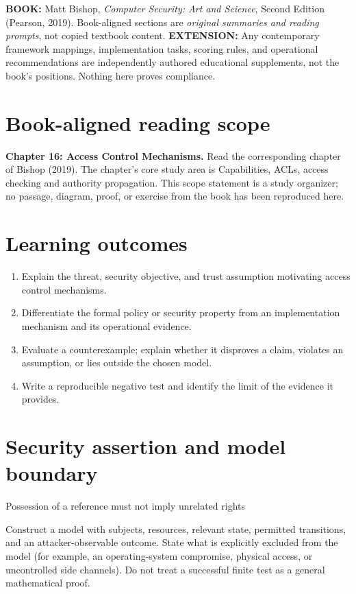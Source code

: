 \documentclass[10pt,letterpaper]{article}
\begin{document}
\makedoctocpage
\begin{notebox}
\textbf{BOOK:} Matt Bishop, \emph{Computer Security: Art and Science}, Second Edition (Pearson, 2019). Book-aligned sections are \emph{original summaries and reading prompts}, not copied textbook content.
\textbf{EXTENSION:} Any contemporary framework mappings, implementation tasks, scoring rules, and operational recommendations are independently authored educational supplements, not the book's positions. Nothing here proves compliance.
\end{notebox}
\section{Book-aligned reading scope}
\textbf{Chapter 16: Access Control Mechanisms.} Read the corresponding chapter of Bishop (2019). The chapter's core study area is Capabilities, ACLs, access checking and authority propagation. This scope statement is a study organizer; no passage, diagram, proof, or exercise from the book has been reproduced here.
\section{Learning outcomes}
\begin{enumerate}
\item Explain the threat, security objective, and trust assumption motivating access control mechanisms.
\item Differentiate the formal policy or security property from an implementation mechanism and its operational evidence.
\item Evaluate a counterexample; explain whether it disproves a claim, violates an assumption, or lies outside the chosen model.
\item Write a reproducible negative test and identify the limit of the evidence it provides.
\end{enumerate}
\section{Security assertion and model boundary}
\begin{infobox}
Possession of a reference must not imply unrelated rights
\end{infobox}
Construct a model with subjects, resources, relevant state, permitted transitions, and an attacker-observable outcome. State what is explicitly excluded from the model (for example, an operating-system compromise, physical access, or uncontrolled side channels). Do not treat a successful finite test as a general mathematical proof.
\end{document}
